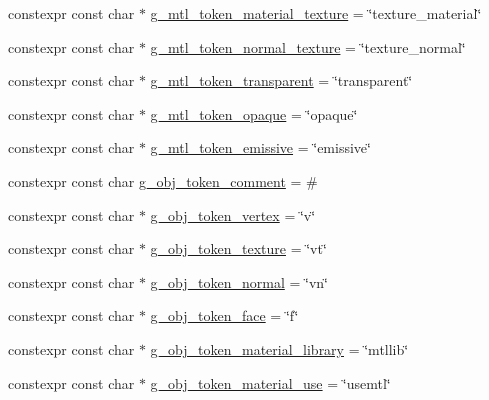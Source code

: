 \begin{DoxyCompactItemize}
\item 
constexpr const char $\ast$ \hyperlink{namespacemage_1_1loader_af1ed85cb87e80c34827df3cc89962064}{g\+\_\+mtl\+\_\+token\+\_\+material\+\_\+texture} = \char`\"{}texture\+\_\+material\char`\"{}
\item 
constexpr const char $\ast$ \hyperlink{namespacemage_1_1loader_a48b11cb6763019a474d607b54a6197fa}{g\+\_\+mtl\+\_\+token\+\_\+normal\+\_\+texture} = \char`\"{}texture\+\_\+normal\char`\"{}
\item 
constexpr const char $\ast$ \hyperlink{namespacemage_1_1loader_af328cadb53f7ba567563476be1cea61d}{g\+\_\+mtl\+\_\+token\+\_\+transparent} = \char`\"{}transparent\char`\"{}
\item 
constexpr const char $\ast$ \hyperlink{namespacemage_1_1loader_a4eabd854cf57ce6c1fcd49eed85230dd}{g\+\_\+mtl\+\_\+token\+\_\+opaque} = \char`\"{}opaque\char`\"{}
\item 
constexpr const char $\ast$ \hyperlink{namespacemage_1_1loader_a81ad4167c58342acae412dc332393eab}{g\+\_\+mtl\+\_\+token\+\_\+emissive} = \char`\"{}emissive\char`\"{}
\item 
constexpr const char \hyperlink{namespacemage_1_1loader_ac9175350a1b432a09495d56ef1a8a18e}{g\+\_\+obj\+\_\+token\+\_\+comment} = \textquotesingle{}\#\textquotesingle{}
\item 
constexpr const char $\ast$ \hyperlink{namespacemage_1_1loader_a5e1d583e5b5baf5d4135d254e3075342}{g\+\_\+obj\+\_\+token\+\_\+vertex} = \char`\"{}v\char`\"{}
\item 
constexpr const char $\ast$ \hyperlink{namespacemage_1_1loader_a766d097bfa881dd65b9e7488a2b3d37c}{g\+\_\+obj\+\_\+token\+\_\+texture} = \char`\"{}vt\char`\"{}
\item 
constexpr const char $\ast$ \hyperlink{namespacemage_1_1loader_a3456adab4f4e3c25801d3aff36396d7e}{g\+\_\+obj\+\_\+token\+\_\+normal} = \char`\"{}vn\char`\"{}
\item 
constexpr const char $\ast$ \hyperlink{namespacemage_1_1loader_a41d912ea1f8cf2075751053dc33fdca4}{g\+\_\+obj\+\_\+token\+\_\+face} = \char`\"{}f\char`\"{}
\item 
constexpr const char $\ast$ \hyperlink{namespacemage_1_1loader_a2f808e4e1b0e354bbdb6fbfc2a86f900}{g\+\_\+obj\+\_\+token\+\_\+material\+\_\+library} = \char`\"{}mtllib\char`\"{}
\item 
constexpr const char $\ast$ \hyperlink{namespacemage_1_1loader_a76bc69e4e7fe64cf538dc26c7e3ee173}{g\+\_\+obj\+\_\+token\+\_\+material\+\_\+use} = \char`\"{}usemtl\char`\"{}
\item 

\end{DoxyCompactItemize}
